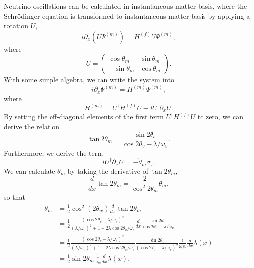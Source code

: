 Neutrino oscillations can be calculated in instantaneous matter basis, where the Schr\"{o}dinger equation is transformed to instantaneous matter basis by applying a rotation $U$,
\begin{equation}
    i \partial_x \left(  U\Psi^{(m)} \right)= H^{(f)} U\Psi^{(m)},
\end{equation}
where
\begin{equation}
    U = \begin{pmatrix} \cos \theta_m & \sin \theta_m \\ -\sin\theta_m & \cos \theta_m \end{pmatrix}.
\end{equation}
With some simple algebra, we can write the system into
\begin{equation}
    i \partial _x \Psi^{(m)} = H^{(m)}\Psi^{(m)} ,
\end{equation}
where
\begin{equation}
    H^{(m)} = U^\dagger H^{(f)} U - i U^\dagger \partial_x U.
\end{equation}
By setting the off-diagonal elements of the first term $U^\dagger H^{(f)} U$ to zero, we can derive the relation
\begin{equation}
   \tan 2\theta_m = \frac{\sin 2\theta_v}{\cos 2\theta_v - \lambda/\omega_v}. 
\end{equation}
Furthermore, we derive the term
\begin{equation}
    i U^\dagger \partial_x U = - \dot\theta_m \sigma_2.
\end{equation}
We can calculate $\dot\theta_m$ by taking the derivative of $\tan 2\theta_m$,
\begin{equation}
    \frac{d}{dx} \tan 2\theta_m = \frac{2}{\cos^2 2\theta_m} \dot\theta_m,
\end{equation}
so that
\begin{align}
    \dot\theta_m &= \frac{1}{2} \cos^2 (2\theta_m) \frac{d}{dx} \tan 2\theta_m \\
   & = \frac{1}{2} \frac{(\cos 2\theta_v - \lambda/\omega_v)^2}{ (\lambda/\omega_v)^2 + 1 - 2\lambda \cos 2\theta_v /\omega_v } \frac{d}{dx} \frac{\sin 2\theta_v}{\cos 2\theta_v - \lambda/\omega_v} \\
   & = \frac{1}{2} \frac{(\cos 2\theta_v - \lambda/\omega_v)^2}{ (\lambda/\omega_v)^2 + 1 - 2\lambda \cos 2\theta_v /\omega_v }  \frac{\sin 2\theta_v}{(\cos 2\theta_v - \lambda/\omega_v)^2} \frac{1}{\omega)v} \frac{d}{dx} \lambda(x) \\
   & = \frac{1}{2} \sin 2\theta_m \frac{1}{\omega_m} \frac{d}{dx} \lambda(x).
\end{align}
   


